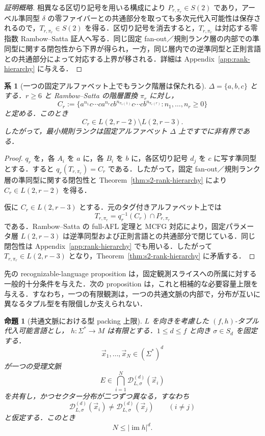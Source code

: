 \documentclass[11pt,a4paper]{ltjsarticle}
\numberwithin{equation}{section}
\theoremstyle{plain}
\newtheorem{proposition}[theorem]{命題}
\newtheorem{corollary}[theorem]{系}
\theoremstyle{definition}
\theoremstyle{remark}
\newcommand{\D}{\mathcal{D}}
\newcommand{\tuple}[1]{\vec{#1}}
\begin{document}
\begin{proof}[証明概略]
相異なる区切り記号を用いる構成により $P_{r,\pi_r}\in S(2)$ であり，アーベル準同型 $\delta$ の零ファイバーとの共通部分を取っても多次元代入可能性は保存されるので，$T_{r,\pi_r}\in S(2)$ を得る．区切り記号を消去すると，$T_{r,\pi_r}$ は対応する零指数 Rambow--Satta 証人へ写る．同じ固定 fan-out／規則ランク層の内部での準同型に関する閉包性から下界が得られ，一方，同じ層内での逆準同型と正則言語との共通部分によって対応する上界が移される．詳細は Appendix~\ref{app:rank-hierarchy} に与える．
\end{proof}

\begin{corollary}[一つの固定アルファベット上でもランク階層は保たれる]
\label{cor:fixed-alphabet-rank-hierarchy}
$\Delta=\{a,b,c\}$ とする．$r\ge6$ と Rambow--Satta の階層置換 $\pi_r$ に対し，
\[
 C_r:=\{a^{n_1}c\cdots ca^{n_r}c
 b^{n_{\pi_r(1)}}c\cdots cb^{n_{\pi_r(r)}}:
 n_1,\ldots,n_r\ge0\}
\]
と定める．このとき
\[
  C_r\in L(2,r-2)\setminus L(2,r-3).
\]
したがって，最小規則ランクは固定アルファベット $\Delta$ 上ですでに非有界である．
\end{corollary}

\begin{proof}
$q_r$ を，各 $A_i$ を $a$ に，各 $B_i$ を $b$ に，各区切り記号 $d_j$ を $c$ に写す準同型とする．すると
$q_r(T_{r,\pi_r})=C_r$ である．したがって，固定 fan-out／規則ランク層の準同型に関する閉包性と Theorem~\ref{thm:s2-rank-hierarchy} により $C_r\in L(2,r-2)$ を得る．

仮に $C_r\in L(2,r-3)$ とする．元のタグ付きアルファベット上では
\[
  T_{r,\pi_r}=q_r^{-1}(C_r)\cap P_{r,\pi_r}
\]
である．Rambow--Satta の full-AFL 定理と MCFG 対応により，固定パラメータ層 $L(2,r-3)$ は逆準同型および正則言語との共通部分で閉じている．同じ閉包性は Appendix~\ref{app:rank-hierarchy} でも用いる．したがって
$T_{r,\pi_r}\in L(2,r-3)$ となり，Theorem~\ref{thm:s2-rank-hierarchy} に矛盾する．
\end{proof}

先の recognizable-language proposition は，固定観測スライスへの所属に対する一般的十分条件を与えた．次の proposition は，これと相補的な必要容量上限を与える．すなわち，一つの有限観測は，一つの共通文脈の内部で，分布が互いに異なるタプル型を有限個しか支えられない．

\begin{proposition}[共通文脈における型 packing 上限]
\label{prop:shared-context-packing}
$L$ を向きを考慮した $(f,h)$-タプル代入可能言語とし，
$h:\Sigma^*\to M$ は有限とする．$1\le d\le f$ と向き
$\sigma\in S_d$ を固定する．
\[
  \tuple x_1,\ldots,\tuple x_N\in(\Sigma^*)^d
\]
が一つの受理文脈
\[
  E\in\bigcap_{i=1}^N \D_{L,\sigma}^{(d)}(\tuple x_i)
\]
を共有し，かつセクター分布が二つずつ異なる，すなわち
\[
  \D_{L,\sigma}^{(d)}(\tuple x_i)
  \ne
  \D_{L,\sigma}^{(d)}(\tuple x_j)
  \qquad(i\ne j)
\]
と仮定する．このとき
\[
  N\le |\operatorname{im}h|^d.
\]
\end{proposition}
\end{document}
